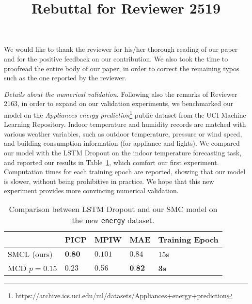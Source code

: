 \documentclass{article}
\title{Rebuttal for Reviewer 2519}
\date{}
\begin{document}

We would like to thank the reviewer for his/her thorough reading of our paper and for the positive feedback on our contribution. We also took the time to proofread the entire body of our paper, in order to correct the remaining typos such as the one reported by the reviewer.

\textit{Details about the numerical validation.} Following also the remarks of Reviewer 2163, in order to expand on our validation experiments, we benchmarked our model on the \textit{Appliances energy prediction}\footnote{https://archive.ics.uci.edu/ml/datasets/Appliances+energy+prediction} public dataset from the UCI Machine Learning Repository.
Indoor temperature and humidity records are matched with various weather variables, such as outdoor temperature, pressure or wind speed, and building consumption information (for appliance and lights).
We compared our model with the LSTM Dropout on the indoor temperature forecasting task, and reported our results in Table~\ref{tab:comparison}, which comfort our first experiment. Computation times for each training epoch are reported, showing that our model is slower, without being prohibitive in practice.
We  hope that this new experiment provides more convincing numerical validation.

\begin{table}[htpb]
	\centering
	\caption{Comparison between LSTM Dropout and our SMC model on the new \texttt{energy} dataset.}
	\label{tab:comparison}
	\begin{tabular}{lllll}
		\toprule
		             & PICP            & MPIW    & MAE             & Training Epoch \\
		\toprule
		SMCL (ours)  & $\textbf{0.80}$ & $0.101$ & $0.84$          & 15s            \\
		MCD $p=0.15$ & $0.23$          & $0.56$  & $\textbf{0.82}$ & \textbf{3s}    \\
		\bottomrule
	\end{tabular}
\end{table}





\end{document}
